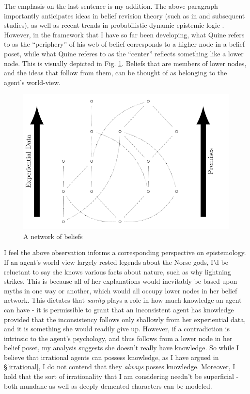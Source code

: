\documentclass[11pt]{article}
\numberwithin{equation}{subsection}
\begin{document}
The emphasis on the last sentence is my addition.  The above paragraph importantly anticipates ideas in belief revision theory (such as in \citet{alchourron_logic_1985} and subsequent studies), as well as recent trends in probabilistic dynamic epistemic logic \citep[such as in][etc.]{van_benthem_conditional_2003,van_benthem_dynamic_2009,baltag_probabilistic_2008,kooi_probabilistic_2003}.  However, in the framework that I have so far been developing, what Quine refers to as the ``periphery'' of his web of belief corresponds to a higher node in a belief poset, while what Quine referes to as the ``center'' reflects something like a lower node.  This is visually depicted in Fig. \ref{fig:poset}.  Beliefs that are members of lower nodes, and the ideas that follow from them, can be thought of as belonging to the agent's world-view.

\begin{figure}[ht]
\begin{center}
\includegraphics[]{poset/poset2.pdf}
\end{center}
\caption{A network of beliefs}
\label{fig:poset}
\end{figure}

I feel the above observation informs a corresponding perspective on
epistemology.  If an agent's world view largely rested legends about
the Norse gods, I'd be reluctant to say she knows various facts about
nature, such as why lightning strikes.  This is because all of her
explanations would inevitably be based upon myths in one way or
another, which would all occupy lower nodes in her belief network.
This dictates that \emph{sanity} plays a role in how much knowledge an
agent can have - it is permissible to grant that an inconsistent agent
has knowledge provided that the inconsistency follows only shallowly
from her experiential data, and it is something she would readily give
up.  However, if a contradiction is intrinsic to the agent's
psychology, and thus follows from a lower node in her belief poset, my
analysis suggests she doesn't really have knowledge.  So while I
believe that irrational agents can possess knowledge, as I have argued
in \S\ref{irrational}, I do not contend that they \emph{always} posses
knowledge. Moreover, I hold that the sort of irrationality that I am
considering needn't be superficial - both mundane as well as deeply
demented characters can be modeled.
\end{document}
